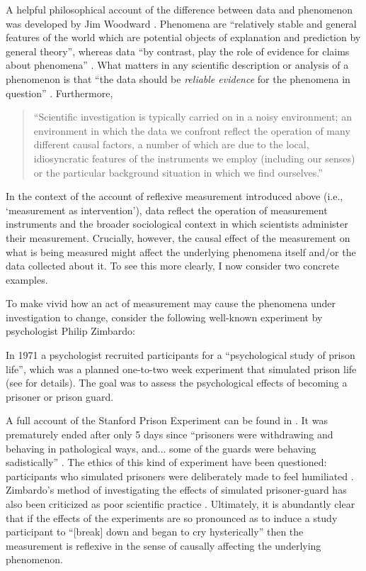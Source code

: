 A helpful philosophical account of the difference between data and phenomenon was developed by Jim Woodward \autocite*{woodward1989}. Phenomena are ``relatively stable and general features of the world which are potential objects of explanation and prediction by general theory'', whereas data ``by contrast, play the role of evidence for claims about phenomena'' \autocite[p393-4]{woodward1989}. What matters in any scientific description or analysis of a phenomenon is that ``the data should be \textit{reliable evidence} for the phenomena in question'' \autocite[p398, emphasis original]{woodward1989}. Furthermore,
\begin{quote}
  ``Scientific investigation is typically carried on in a noisy environment; an environment in which the data we confront reflect the operation of many different causal factors, a number of which are due to the local, idiosyncratic features of the instruments we employ (including our senses) or the particular background situation in which we find ourselves.'' \autocite[p398]{woodward1989}
\end{quote}
\noindent In the context of the account of reflexive measurement introduced above (i.e., `measurement as intervention'), data reflect the operation of measurement instruments and the broader sociological context in which scientists administer their measurement. Crucially, however, the causal effect of the measurement on what is being measured might affect the underlying phenomena itself and/or the data collected about it. To see this more clearly, I now consider two concrete examples.

To make vivid how an act of measurement may cause the phenomena under investigation to change, consider the following well-known experiment by psychologist Philip Zimbardo:

\begin{example}\label{ex_spe}
In 1971 a psychologist recruited participants for a ``psychological study of prison life'', which was a planned one-to-two week experiment that simulated prison life (see \cite[\S 2]{spe} for details). The goal was to assess the psychological effects of becoming a prisoner or prison guard.
\end{example}

\noindent A full account of the Stanford Prison Experiment can be found in \autocite{zimbardo2008}. It was prematurely ended after only 5 days since ``prisoners were withdrawing and behaving in pathological ways, and... some of the guards were behaving sadistically'' \autocite[\S 8]{spe}. The ethics of this kind of experiment have been questioned: participants who simulated prisoners were deliberately made to feel humiliated \autocite[\S 3]{spe}. Zimbardo's method of investigating the effects of simulated prisoner-guard has also been criticized as poor scientific practice \autocite{letexier2019}. Ultimately, it is abundantly clear that if the effects of the experiments are so pronounced as to induce a study participant to ``[break] down and began to cry hysterically'' \autocite[\S 8]{spe} then the measurement is reflexive in the sense of causally affecting the underlying phenomenon.

